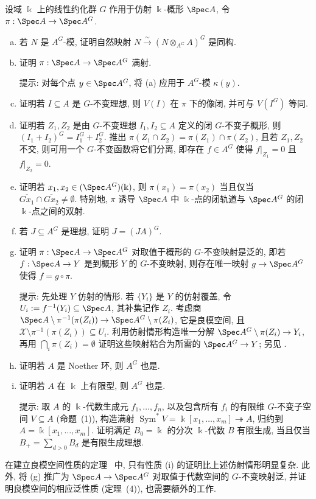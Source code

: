 \begin{exercise}\label{src:7.5.1}
设域 $\Bbbk$ 上的线性约化群 $G$ 作用于仿射 $\Bbbk$-概形 $\Spec A$, 令 $\pi:\Spec A\to\Spec A^G$.
\begin{enumerate}[(a)]
\item 若 $N$ 是 $A^G$-模, 证明自然映射 $N\xrightarrow{\sim}(N\otimes_{A^G}A)^G$ 是同构.
\item 证明 $\pi:\Spec A\to\Spec A^G$ 满射.

提示: 对每个点 $y\in\Spec A^G$, 将 (a) 应用于 $A^G$-模 $\kappa(y)$.
\item 证明若 $I\subseteq A$ 是 $G$-不变理想, 则 $V(I)$ 在 $\pi$ 下的像闭, 并可与 $V(I^G)$ 等同.
\item 证明若 $Z_1,Z_2$ 是由 $G$-不变理想 $I_1,I_2\subseteq A$ 定义的闭 $G$-不变子概形, 则 $(I_1+I_2)^G=I_1^G+I_2^G$. 推出 $\pi(Z_1\cap Z_2)=\pi(Z_1)\cap\pi(Z_2)$, 且若 $Z_1,Z_2$ 不交, 则可用一个 $G$-不变函数将它们分离, 即存在 $f\in A^G$ 使得 $f|_{Z_1}=0$ 且 $f|_{Z_2}=0$.
\item 证明若 $x_1,x_2\in(\Spec A^G)(\Bbbk)$, 则 $\pi(x_1)=\pi(x_2)$ 当且仅当 $\overline{Gx_1}\cap\overline{Gx_2}\ne\emptyset$. 特别地, $\pi$ 诱导 $\Spec A$ 中 $\Bbbk$-点的闭轨道与 $\Spec A^G$ 的闭 $\Bbbk$-点之间的双射.
\item 若 $J\subseteq A^G$ 是理想, 证明 $J=(JA)^G$.
\item 证明 $\pi:\Spec A\to\Spec A^G$ 对取值于概形的 $G$-不变映射是泛的, 即若 $f:\Spec A\to Y$ 是到概形 $Y$ 的 $G$-不变映射, 则存在唯一映射 $g\to\Spec A^G$ 使得 $f=g\circ\pi$.

提示: 先处理 $Y$ 仿射的情形. 若 $\{Y_i\}$ 是 $Y$ 的仿射覆盖, 令 $U_i:=f^{-1}(Y_i)\subseteq\Spec A$, 其补集记作 $Z_i$. 考虑商 $\Spec A\setminus\pi^{-1}(\pi(Z_i))\to\Spec A^G\setminus\pi(Z_i)$, 它是良模空间, 且 $\mathcal X\setminus\pi^{-1}(\pi(Z_i))\subseteq U_i$. 利用仿射情形构造唯一分解 $\Spec A^G\setminus\pi(Z_i)\to Y_i$, 再用 $\bigcap_i\pi(Z_i)=\emptyset$ 证明这些映射粘合为所需的 $\Spec A^G\to Y$; 另见 \cite[\S0.6]{GIT}.
\item 证明若 $A$ 是 Noether 环, 则 $A^G$ 也是.
\item 证明若 $A$ 在 $\Bbbk$ 上有限型, 则 $A^G$ 也是.

提示: 取 $A$ 的 $\Bbbk$-代数生成元 $f_1,\ldots,f_n$, 以及包含所有 $f_i$ 的有限维 $G$-不变子空间 $V\subseteq A$ (命题~(1)), 构造满射 $\operatorname{Sym}^*V=\Bbbk[x_1,\ldots,x_m]\twoheadrightarrow A$, 归约到 $A=\Bbbk[x_1,\ldots,x_m]$. 证明满足 $B_0=\Bbbk$ 的分次 $\Bbbk$-代数 $B$ 有限生成, 当且仅当 $B_+=\sum_{d>0}B_d$ 是有限生成理想.
\end{enumerate}
\end{exercise}
在建立良模空间性质的定理~ 中, 只有性质 (i) 的证明比上述仿射情形明显复杂. 此外, 将 (g) 推广为 $\Spec A\to\Spec A^G$ 对取值于代数空间的 $G$-不变映射泛, 并证明良模空间的相应泛性质 (定理~(4)), 也需要额外的工作.

